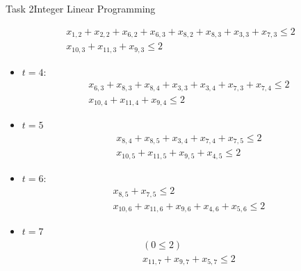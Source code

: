 \begin{frame}[allowframebreaks]{Task 2}{Integer Linear Programming}
\begin{solutionnoinc}
\begin{itemize}
\begin{itemize}
\[\begin{gathered}
          x_{1,2}+x_{2,2}+x_{6,2}+x_{6,3}+x_{8,2}+x_{8,3}+x_{3,3}+x_{7,3} \leq 2 \\
          x_{10,3}+x_{11,3}+x_{9,3} \leq 2
          \end{gathered}
        \]
      \end{itemize}
    \end{itemize}
  \end{solutionnoinc}
  \begin{solution}
    \begin{itemize}
    \item $t=4$:
      \[
      \begin{gathered}
      x_{6,3}+x_{8,3}+x_{8,4}+x_{3,3}+x_{3,4}+x_{7,3}+x_{7,4} \leq 2 \\
      x_{10,4}+x_{11,4}+x_{9,4} \leq 2
      \end{gathered}
      \]
    \item $t=5$
      \[
      \begin{gathered}
      x_{8,4}+x_{8,5}+x_{3,4}+x_{7,4}+x_{7,5} \leq 2 \\
      x_{10,5}+x_{11,5}+x_{9,5}+x_{4,5} \leq 2
      \end{gathered}
      \]
    \item $t=6$:
      \[
      \begin{gathered}
      x_{8,5}+x_{7,5} \leq 2 \\
      x_{10,6}+x_{11,6}+x_{9,6}+x_{4,6}+x_{5,6} \leq 2
      \end{gathered}
      \]
    \item $t=7$
      \[
      \begin{gathered}
      (0 \leq 2) \\
      x_{11,7}+x_{9,7}+x_{5,7} \leq 2
      \end{gathered}
      \]
    \end{itemize}
  \end{solution}
\end{frame}
